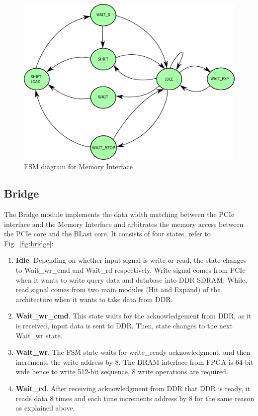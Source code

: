 \begin{figure}
\centering
\includegraphics[width=\columnwidth]{Figures/FSM_Mem_New.pdf}
\caption{FSM diagram for Memory Interface} \label{fig:MemInt}
\end{figure}


\subsection{Bridge}
The Bridge module implements the data width matching between the PCIe interface and the Memory Interface and arbitrates the memory access between the PCIe core and the BLast core. 
It consists of four states, refer to Fig.~\ref{fig:bridge}:
\begin{enumerate}
\item \textbf{Idle}. Depending on whether input signal is write or read, the state changes to Wait\_wr\_cmd and Wait\_rd respectively. Write signal comes from PCIe when it wants to write query data and database into DDR SDRAM. While, read signal comes from two main modules (Hit and Expand) of the architecture when it wants to take data from DDR.
\item \textbf{Wait\_wr\_cmd}. This state waits for the acknowledgement from DDR, as it is received, input data is sent to DDR. Then, state changes to the next Wait\_wr state.
\item \textbf{Wait\_wr}. The FSM state waits for write\_ready acknowledgment, and then increments the write address by 8.
The DRAM interface from FPGA is 64-bit wide hence to write 512-bit sequence, 8 write operations are required. 
\item \textbf{Wait\_rd}. After receiving acknowledgment from DDR that DDR is ready, it reads data 8 times and each time increments address by 8 for the same reason as explained above. 
\end{enumerate}


